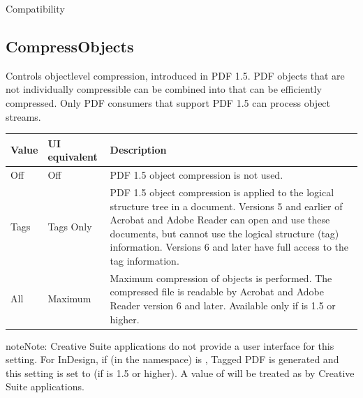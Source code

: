 \documentclass[letterpaper,12pt,english,openany,oneside]{sphinxmanual}
\begin{document}
Compatibility

\label{\detokenize{PDF_Create_CommonSettings:default-value-3}}

\begin{sphinxVerbatim}[commandchars=\\\{\}]
\end{sphinxVerbatim}




\subsection{CompressObjects}
\label{\detokenize{PDF_Create_CommonSettings:compressobjects}}
Controls object\sphinxhyphen{}level compression, introduced in PDF 1.5. PDF objects that are not individually compressible can be combined into  that can be efficiently compressed. Only PDF consumers that support PDF 1.5 can process object streams.


\begin{savenotes}\sphinxattablestart
\centering
{}\label{\detokenize{PDF_Create_CommonSettings:section-2}}\nobreak
\begin{tabulary}{\linewidth}[t]{|T|T|T|}
\hline
\sphinxstyletheadfamily 
Value
&\sphinxstyletheadfamily 
UI equivalent
&\sphinxstyletheadfamily 
Description
\\
\hline
Off
&
Off
&
PDF 1.5 object compression is not used.
\\
\hline
Tags
&
Tags Only
&
PDF 1.5 object compression is applied to the logical structure tree in a document. Versions 5 and earlier of Acrobat and Adobe Reader can open and use these documents, but cannot use the logical structure (tag) information. Versions 6 and later have full access to the tag information.
\\
\hline
All
&
Maximum
&
Maximum compression of objects is performed. The compressed file is readable by Acrobat and Adobe Reader version 6 and later. Available only if  is 1.5 or higher.
\\
\hline
\end{tabulary}
\par
\sphinxattableend\end{savenotes}

\begin{sphinxadmonition}{note}{Note:}
Creative Suite applications do not provide a user interface for this setting. For InDesign, if  (in the  namespace) is  , Tagged PDF is generated and this setting is set to  (if  is 1.5 or higher). A value of  will be treated as  by Creative Suite applications.
\end{sphinxadmonition}
\label{\detokenize{PDF_Create_CommonSettings:supported-by-4}}
\end{document}
